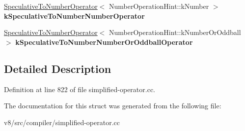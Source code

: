 \begin{DoxyCompactItemize}
\item 
\mbox{\label{structv8_1_1internal_1_1compiler_1_1SimplifiedOperatorGlobalCache_aad35f3b042cb5172d6eacb4e5e310312}} 
\mbox{\hyperlink{structv8_1_1internal_1_1compiler_1_1SimplifiedOperatorGlobalCache_1_1SpeculativeToNumberOperator}{Speculative\+To\+Number\+Operator}}$<$ Number\+Operation\+Hint\+::k\+Number $>$ {\bfseries k\+Speculative\+To\+Number\+Number\+Operator}
\item 
\mbox{\label{structv8_1_1internal_1_1compiler_1_1SimplifiedOperatorGlobalCache_a3ccfe578f9af42d3bd753b46ac964887}} 
\mbox{\hyperlink{structv8_1_1internal_1_1compiler_1_1SimplifiedOperatorGlobalCache_1_1SpeculativeToNumberOperator}{Speculative\+To\+Number\+Operator}}$<$ Number\+Operation\+Hint\+::k\+Number\+Or\+Oddball $>$ {\bfseries k\+Speculative\+To\+Number\+Number\+Or\+Oddball\+Operator}
\end{DoxyCompactItemize}


\subsection{Detailed Description}


Definition at line 822 of file simplified-\/operator.\+cc.



The documentation for this struct was generated from the following file\+:\begin{DoxyCompactItemize}
\item 
v8/src/compiler/simplified-\/operator.\+cc\end{DoxyCompactItemize}

